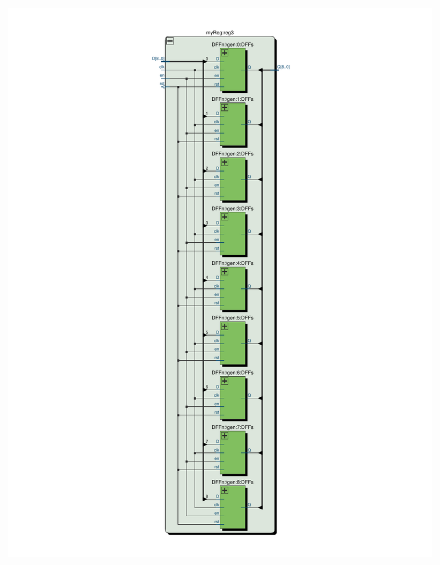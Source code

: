 \documentclass[13pt,a4paper]{report}
\begin{document}
\begin{figure}[H]
{\includegraphics[scale=0.6, clip, trim={4cm 1cm 4cm 1.45cm}]{images/Exc1_myReg_RTL.pdf}
}
\end{figure}
\end{document}
